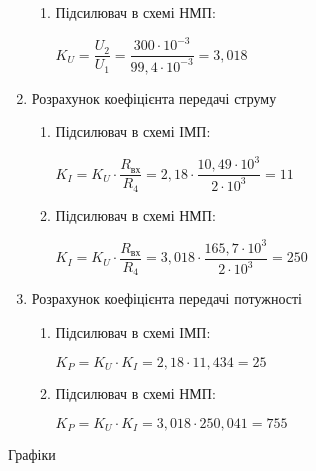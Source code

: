 \documentclass[a4paper,14pt]{extreport}
\begin{document}
\begin{enumerate}
\begin{enumerate}
\item Підсилювач в схемі НМП:
\begin{center}
$K_U=\dfrac{U_2}{U_1} = \dfrac{300\cdot{10^{-3}}}{99,4\cdot{10^{-3}}}=3,018$
\end{center}
\end{enumerate}



\item Розрахунок коефіцієнта передачі струму

\begin{enumerate}
\item Підсилювач в схемі ІМП:
\begin{center}
$K_I=K_U\cdot{\dfrac{R_{\text{вх}}}{R_4}}=2,18\cdot{\dfrac{10,49\cdot{10^3}}{2\cdot{10^3}}}=11$\\
\end{center}

\item Підсилювач в схемі НМП:
\begin{center}
$K_I=K_U\cdot{\dfrac{R_{\text{вх}}}{R_4}}=3,018\cdot{\dfrac{165,7\cdot{10^3}}{2\cdot{10^3}}}=250$
\end{center}
\end{enumerate}



\item Розрахунок коефіцієнта передачі потужності

\begin{enumerate}
\item Підсилювач в схемі ІМП:
\begin{center}
$K_P=K_U\cdot{K_I}=2,18\cdot{11,434}=25$\\
\end{center}

\item Підсилювач в схемі НМП:
\begin{center}
$K_P=K_U\cdot{K_I}=3,018\cdot{250,041}=755$
\end{center}
\end{enumerate}
\end{enumerate}















\newpage
\begin{center}Графіки\end{center}\par
\end{document}
